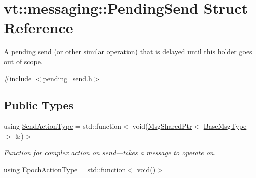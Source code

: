 \hypertarget{structvt_1_1messaging_1_1_pending_send}{}\section{vt\+:\+:messaging\+:\+:Pending\+Send Struct Reference}
\label{structvt_1_1messaging_1_1_pending_send}


A pending send (or other similar operation) that is delayed until this holder goes out of scope.  




{\ttfamily \#include $<$pending\+\_\+send.\+h$>$}

\subsection*{Public Types}
\begin{DoxyCompactItemize}
\item 
using \hyperlink{structvt_1_1messaging_1_1_pending_send_aa13248a342d68230048cde8e0756851c}{Send\+Action\+Type} = std\+::function$<$ void(\hyperlink{structvt_1_1messaging_1_1_msg_shared_ptr}{Msg\+Shared\+Ptr}$<$ \hyperlink{namespacevt_a44d0d4e144748f2b19a1cfd962f50338}{Base\+Msg\+Type} $>$ \&)$>$
\begin{DoxyCompactList}\small\item\em Function for complex action on send---takes a message to operate on. \end{DoxyCompactList}\item 
using \hyperlink{structvt_1_1messaging_1_1_pending_send_a25131dc5a5e003dc65187edc97c23d1c}{Epoch\+Action\+Type} = std\+::function$<$ void()$>$
\end{DoxyCompactItemize}
